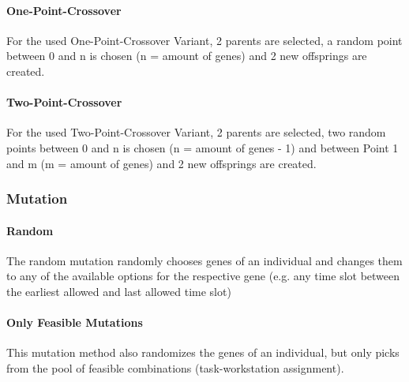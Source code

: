 \documentclass[a4paper,12pt,twoside]{scrreprt}
\begin{document}
\begin{flushleft}
\paragraph{One-Point-Crossover}
For the used One-Point-Crossover Variant, 2 parents are selected, a random point between 0 and n is chosen (n = amount of genes) and 2 new offsprings are created.

\paragraph{Two-Point-Crossover}
For the used Two-Point-Crossover Variant, 2 parents are selected, two random points between 0 and n is chosen (n = amount of genes - 1) and between Point 1 and m (m = amount of genes) and 2 new offsprings are created.

\subsubsection{Mutation}

\paragraph{Random}
The random mutation randomly chooses genes of an individual and changes them to any of the available options for the respective gene (e.g. any time slot between the earliest allowed and last allowed time slot)

\paragraph{Only Feasible Mutations}
This mutation method also randomizes the genes of an individual, but only picks from the pool of feasible combinations (task-workstation assignment).


\end{flushleft}
\end{document}
